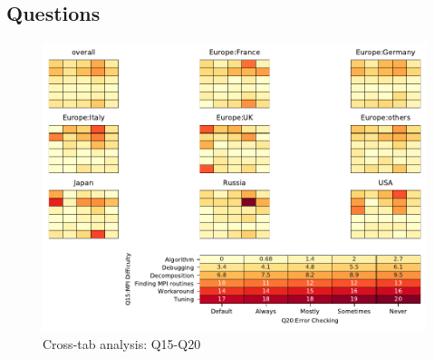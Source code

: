 
\subsection{Questions}


\begin{figure}
\begin{center}
\includegraphics[width=12cm]{../pdfs/Q15-Q20.pdf}
\caption{Cross-tab analysis: Q15-Q20}
\label{fig:Q15-Q20}
\end{center}
\end{figure}
